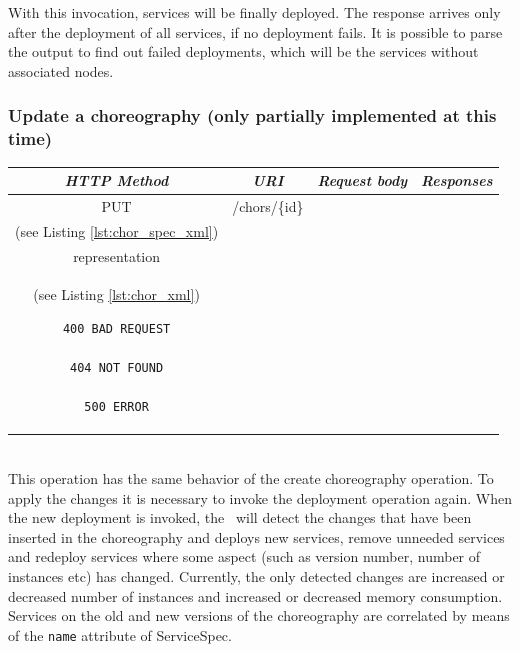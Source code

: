 With this invocation, services will be finally deployed.
The response arrives only after the deployment of all services, if no deployment fails.
It is possible to parse the output to find out failed deployments, which will be the services without associated nodes.

\subsubsection*{Update a choreography (only partially implemented at this time)}

\begin{tabular}{|c|c|c|c|}
\hline 
\itshape{HTTP Method} & \itshape{URI} & \itshape{Request body} & \itshape{Responses} \\ 
\hline 
PUT & /chors/\{id\} & 

\begin{minipage}{2in}
\verb!ChorSpec! XML representation \\ 
(see Listing \ref{lst:chor_spec_xml})
\end{minipage} 
&
\begin{minipage}{2in}
\begin{verbatim}

200 OK
location = "/chors/{id}"
Body: 
\end{verbatim}
\verb!Choreography! XML \\
representation \\
(see Listing \ref{lst:chor_xml})
\begin{verbatim}
400 BAD REQUEST

404 NOT FOUND

500 ERROR

\end{verbatim}
\end{minipage} 
\\ 
\hline 
\end{tabular} \\

This operation has the same behavior of the create choreography operation.
To apply the changes it is necessary to invoke the deployment operation again.
When the new deployment is invoked, the \ee\ will detect the changes that have
been inserted in the choreography and deploys new services, remove unneeded services and redeploy
services where some aspect (such as version number, number of instances etc) has changed.
Currently, the only detected changes are increased or decreased number of instances
and increased or decreased memory consumption. Services on the old and new versions
of the choreography are correlated by means of the \texttt{name} attribute of ServiceSpec.

